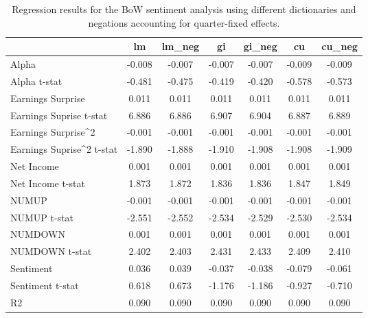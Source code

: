 \begin{table}
\caption{Regression results for the BoW sentiment analysis using different dictionaries and negations accounting for quarter-fixed effects.}
\label{tab:bow_regressions_quarter_fixed}
\begin{tabular}{lcccccc}
\toprule
 & lm & lm_neg & gi & gi_neg & cu & cu_neg \\
\midrule
Alpha & -0.008 & -0.007 & -0.007 & -0.007 & -0.009 & -0.009 \\
Alpha t-stat & -0.481 & -0.475 & -0.419 & -0.420 & -0.578 & -0.573 \\
Earnings Surprise & 0.011 & 0.011 & 0.011 & 0.011 & 0.011 & 0.011 \\
Earnings Suprise t-stat & 6.886 & 6.886 & 6.907 & 6.904 & 6.887 & 6.889 \\
Earnings Surprise^2 & -0.001 & -0.001 & -0.001 & -0.001 & -0.001 & -0.001 \\
Earnings Suprise^2 t-stat & -1.890 & -1.888 & -1.910 & -1.908 & -1.908 & -1.909 \\
Net Income & 0.001 & 0.001 & 0.001 & 0.001 & 0.001 & 0.001 \\
Net Income t-stat & 1.873 & 1.872 & 1.836 & 1.836 & 1.847 & 1.849 \\
NUMUP & -0.001 & -0.001 & -0.001 & -0.001 & -0.001 & -0.001 \\
NUMUP t-stat & -2.551 & -2.552 & -2.534 & -2.529 & -2.530 & -2.534 \\
NUMDOWN & 0.001 & 0.001 & 0.001 & 0.001 & 0.001 & 0.001 \\
NUMDOWN t-stat & 2.402 & 2.403 & 2.431 & 2.433 & 2.409 & 2.410 \\
Sentiment & 0.036 & 0.039 & -0.037 & -0.038 & -0.079 & -0.061 \\
Sentiment t-stat & 0.618 & 0.673 & -1.176 & -1.186 & -0.927 & -0.710 \\
R2 & 0.090 & 0.090 & 0.090 & 0.090 & 0.090 & 0.090 \\
\bottomrule
\end{tabular}
\end{table}
